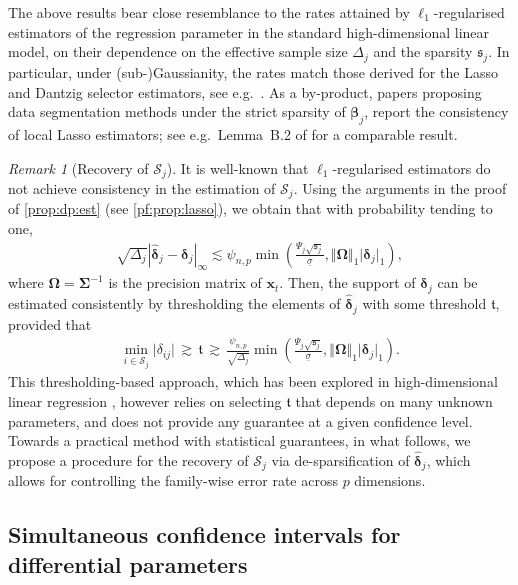 \documentclass[11pt, a4paper]{article}
\newcommand{\mbf}{\mathbf}
\newcommand{\mc}{\mathcal}
\renewcommand{\l}{\left}
\renewcommand{\r}{\right}
\def\wh{\widehat}
\theoremstyle{definition}
\theoremstyle{definition}
\theoremstyle{definition}
\theoremstyle{definition}
\theoremstyle{definition}
\theoremstyle{remark}
\newtheorem{rem}{Remark}[section]
\theoremstyle{definition}
\theoremstyle{definition}
\theoremstyle{definition}
\begin{document}
The above results bear close resemblance to the rates attained by $\ell_1$-regularised estimators of the regression parameter in the standard high-dimensional linear model, on their dependence on the effective sample size $\Delta_j$ and the sparsity $\mathfrak{s}_j$.
In particular, under (sub-)Gaussianity, the rates match those derived for the Lasso and Dantzig selector estimators, see e.g.\ \cite{bickel2009simultaneous}.
As a by-product, papers proposing data segmentation methods under the strict sparsity of $\bm\beta_j$, report the consistency of local Lasso estimators; see e.g.\ Lemma~B.2 of \cite{cho2022high} for a comparable result.

\begin{rem}[Recovery of $\mc S_j$]
\label{rem:linf}
It is well-known that $\ell_1$-regularised estimators do not achieve consistency in the estimation of $\mc S_j$.
Using the arguments in the proof of \cref{prop:dp:est} (see \cref{pf:prop:lasso}), we obtain that with probability tending to one,
\begin{align*}
\sqrt{\Delta_j} \l\vert \wh{\bm\delta}_j - \bm\delta_j \r\vert_\infty \lesssim \psi_{n, p} \min \l( \frac{\Psi_j \sqrt{\mathfrak{s}_j}}{\underline{\sigma}}, \Vert \bm\Omega \Vert_1 \vert \bm\delta_j \vert_1 \r),
\end{align*}
where $\bm\Omega = \bm\Sigma^{-1}$ is the precision matrix of $\mbf x_t$.
Then, the support of $\bm\delta_j$ can be estimated consistently by thresholding the elements of $\wh{\bm\delta}_j$ with some threshold $\mathfrak{t}$, provided that
\begin{align*}
\min_{i \in \mc S_j} \vert \delta_{ij} \vert \, \gtrsim \, \mathfrak{t} \, \gtrsim  \, \frac{\psi_{n, p}}{\sqrt{\Delta_j}} \min\l( \frac{\Psi_j \sqrt{\mathfrak{s}_j}}{\underline{\sigma}}, \Vert \bm\Omega \Vert_1 \vert \bm\delta_j \vert_1 \r).
\end{align*}
This thresholding-based approach, which has been explored in high-dimensional linear regression \citep{van2011adaptive}, however relies on selecting $\mathfrak{t}$ that depends on many unknown parameters, and does not provide any guarantee at a given confidence level.
Towards a practical method with statistical guarantees, in what follows, we propose a procedure for the recovery of $\mc S_j$ via de-sparsification of $\wh{\bm\delta}_j$, which allows for controlling the family-wise error rate across $p$ dimensions.
\end{rem}

\subsection{Simultaneous confidence intervals for differential parameters}
\label{sec:diff:inf}
\end{document}
